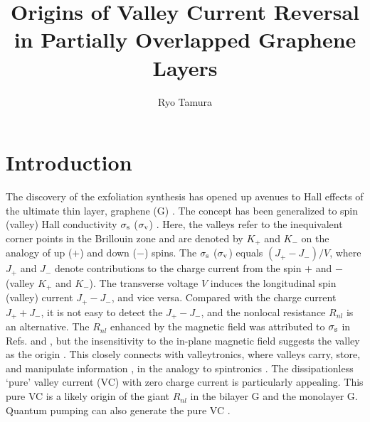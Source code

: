 \documentclass{jpsj3}
\title{Origins of Valley Current Reversal in Partially Overlapped Graphene Layers}
\author{Ryo Tamura}
\begin{document}
\maketitle

\section{Introduction} 

The discovery of the exfoliation synthesis\cite{exfoil} has opened up avenues to Hall effects \cite{QHE,QHE2} of the ultimate thin layer, graphene (G) \cite{(1),graphene-review,graphene-review2}.
The concept has been generalized to spin (valley) 
Hall conductivity $\sigma_{\rm s}$ ($\sigma_{\rm v}$)
\cite{r9.,monolayer-theory2}. Here, the valleys refer to the inequivalent
corner points in the Brillouin zone 
and are denoted by $K_+$ and $K_-$
on the analogy of up ($+$) and down ($-$) spins.
The $\sigma_{\rm s}$ ($\sigma_{\rm v}$) equals $(J_+-J_-)/V$,
where $J_+$ and $J_-$ denote contributions to the charge current
from the spin $+$ and $-$ (valley $K_+$ and $K_-$).
The transverse voltage $V$ induces the longitudinal spin (valley) current $J_+-J_-$, and vice versa.
Compared with the charge current $J_++J_-$, it is not easy to detect the $J_+-J_-$, and the nonlocal resistance $R_{nl}$ is an alternative.
The $R_{nl}$ enhanced by the magnetic field was attributed
to $\sigma_{\rm s}$ in Refs. \cite{s1.} and  \cite{s2.} , 
but the insensitivity to the in-plane magnetic field suggests 
 the valley as the origin \cite{s3.,(3)}.
This closely connects with valleytronics, where valleys carry, store, and manipulate information \cite{valley-review,valley-review2,valley-review3},
 in the analogy to spintronics \cite{s32.,spin}.
The dissipationless `pure' valley current (VC) with zero charge current is particularly appealing.
This pure VC is a likely origin of the giant $R_{nl}$ in the bilayer G \cite{bilayer,bilayer2,bilayer3,recent-experiment} and the monolayer G\cite{bilayer-theory-strain,monolayer-theory2, monolayer,monolayer2,monolayer-theory}.
Quantum pumping can also generate the pure VC \cite{34.}.
\end{document}
